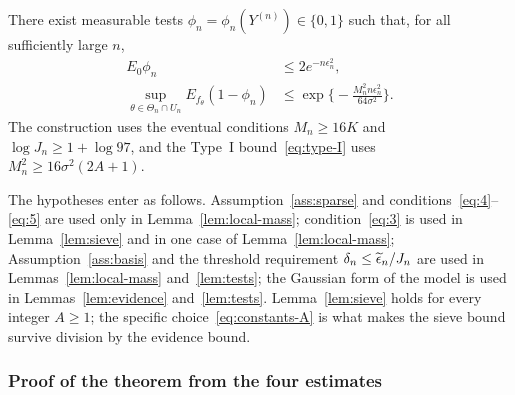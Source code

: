 \begin{auxlemma}[Tests]\label{lem:tests}
There exist measurable tests $\phi_n=\phi_n(Y^{(n)})\in\{0,1\}$ such that, for all sufficiently large $n$,
\begin{align}
E_0\phi_n&\leq2e^{-n\epsilon_n^2},
\label{eq:type-I}\\
\sup_{\theta\in\Theta_n\cap U_n}E_{f_\theta}(1-\phi_n)
&\leq\exp\Big\{-\frac{M_n^2n\epsilon_n^2}{64\sigma^2}\Big\}.
\label{eq:type-II}
\end{align}
The construction uses the eventual conditions $M_n\geq16K$ and $\log J_n\geq1+\log97$, and the Type~I bound~\eqref{eq:type-I} uses $M_n^2\geq16\sigma^2(2A+1)$.
\end{auxlemma}

The hypotheses enter as follows. Assumption~\ref{ass:sparse} and conditions~\eqref{eq:4}--\eqref{eq:5} are used only in Lemma~\ref{lem:local-mass}; condition~\eqref{eq:3} is used in Lemma~\ref{lem:sieve} and in one case of Lemma~\ref{lem:local-mass}; Assumption~\ref{ass:basis} and the threshold requirement $\delta_n\leq\widetilde{\epsilon}_n/J_n$ are used in Lemmas~\ref{lem:local-mass} and~\ref{lem:tests}; the Gaussian form of the model is used in Lemmas~\ref{lem:evidence} and~\ref{lem:tests}. Lemma~\ref{lem:sieve} holds for every integer $A\geq1$; the specific choice~\eqref{eq:constants-A} is what makes the sieve bound survive division by the evidence bound.

\subsubsection*{Proof of the theorem from the four estimates}

